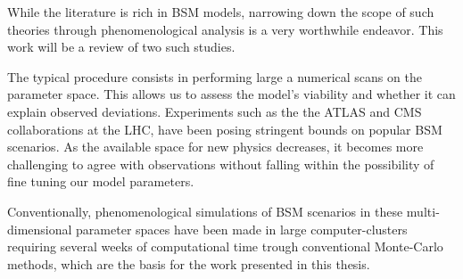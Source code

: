 \documentclass[10pt]{book}
\renewcommand{\(}{\left(}
\renewcommand{\)}{\right)}
\renewcommand{\[}{\left[}
\renewcommand{\]}{\right]}
\begin{document}
While the literature is rich in BSM models, narrowing down the scope of such theories through phenomenological analysis is a very worthwhile endeavor. This work will be a review of two such studies. %

The typical procedure consists in performing large a numerical scans on the parameter space. %
%
This allows us to assess the model's viability and whether it can explain observed deviations. 
%
%
%
%
Experiments such as the the ATLAS and CMS collaborations at the LHC, have been posing stringent bounds on popular BSM scenarios. 
%
As the available space for new physics decreases, it becomes more challenging to agree with observations without falling within the possibility of fine tuning our model parameters.
%

%

Conventionally, phenomenological simulations of BSM scenarios in these multi-dimensional parameter spaces have been made in large computer-clusters requiring several weeks of computational time trough conventional Monte-Carlo methods, which are the basis for the work presented in this thesis.
%
%
%
\end{document}
